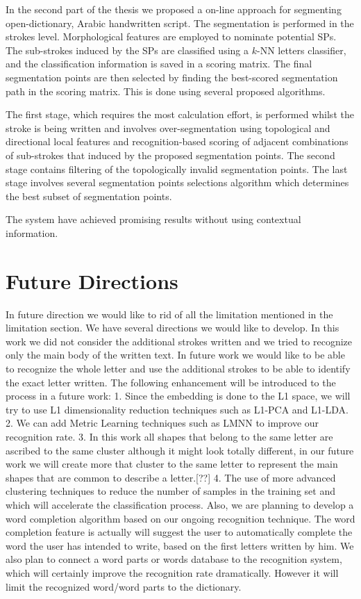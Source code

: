 In the second part of the thesis we proposed a on-line approach for segmenting open-dictionary, Arabic handwritten script.
The segmentation is performed in the strokes level. 
Morphological features are employed to nominate potential SPs. 
The sub-strokes induced by the SPs are classified using a $k$-NN letters classifier, and the classification information is saved in a scoring matrix.
The final segmentation points are then selected by finding the best-scored segmentation path in the scoring matrix. 
This is done using several proposed algorithms.

The first stage, which requires the most calculation effort, is performed whilst the stroke is being written and involves over-segmentation using topological and directional local features and recognition-based scoring of adjacent combinations of sub-strokes that induced by the proposed segmentation points. 
The second stage contains filtering of the topologically invalid segmentation points. 
The last stage involves several segmentation points selections algorithm which determines the best subset of segmentation points.

The system have achieved promising results without using contextual information.

\newpage{}

\section{Future Directions}
\label{sec:future_directions}
In future direction we would like to rid of all the limitation mentioned in the limitation section.
We have several directions we would like to develop. In this work we did not consider the additional strokes written and we tried to recognize only the main body of the written text. In future work we would like to be able to recognize the whole letter and use the additional strokes to be able to identify the exact letter written.
The following enhancement will be introduced to the process in a future work: 1. Since the embedding is done to the L1 space, we will try to use L1 dimensionality reduction techniques such as L1-PCA and L1-LDA. 2. We can add Metric Learning techniques such as LMNN to improve our recognition rate. 3. In this work all shapes that belong to the same letter are ascribed to the same cluster although it might look totally different, in our future work we will create more that cluster to the same letter to represent the main shapes that are common to describe a letter.[??] 4. The use of more advanced clustering techniques to reduce the number of samples in the training set and which will accelerate the classification process.
Also, we are planning to develop a word completion algorithm based on our ongoing recognition technique. The word completion feature is actually  will suggest the user to automatically complete the word the user has intended to write, based on the first letters written by him. 
We also plan to connect a word parts or words database to the recognition system, which will certainly improve the recognition rate dramatically. However it will limit the recognized word/word parts to the dictionary.

